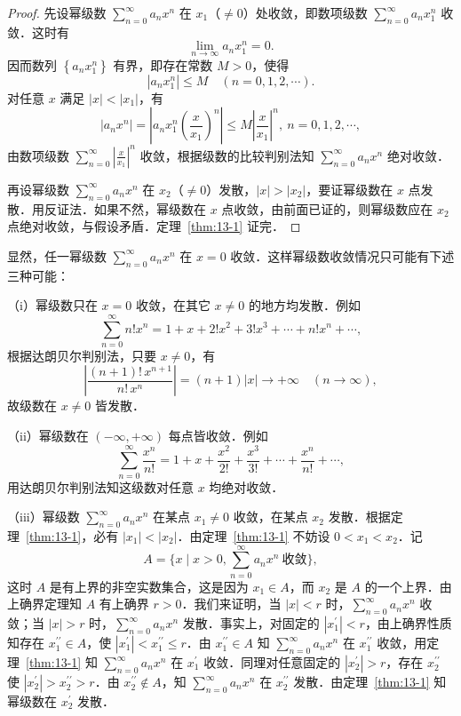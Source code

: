 \begin{proof}
先设幂级数 $\displaystyle\sum_{n=0}^{\infty}a_{n}x^{n}$ 在 $x_{1}$（$\neq 0$）处收敛，即数项级数 $\displaystyle\sum_{n=0}^{\infty}a_{n}x_{1}^{n}$ 收敛．这时有
\[
\lim_{n\to\infty}a_{n}x_{1}^{n}=0.
\]
因而数列 $\left\{a_{n}x_{1}^{n}\right\}$ 有界，即存在常数 $M>0$，使得
\[
\left|a_{n}x_{1}^{n}\right|\leqslant M\quad(n=0,1,2,\cdots).
\]
对任意 $x$ 满足 $\left|x\right|<\left|x_{1}\right|$，有
\[
\left|a_{n}x^{n}\right|=\left|a_{n}x_{1}^{n}\left(\frac{x}{x_{1}}\right)^{n}\right|\leqslant M\left|\frac{x}{x_{1}}\right|^{n},\ n=0,1,2,\cdots,
\]
由数项级数 $\displaystyle\sum_{n=0}^{\infty}\left|\frac{x}{x_{1}}\right|^{n}$ 收敛，根据级数的比较判别法知 $\displaystyle\sum_{n=0}^{\infty}a_{n}x^{n}$ 绝对收敛．

再设幂级数 $\displaystyle\sum_{n=0}^{\infty}a_{n}x^{n}$ 在 $x_{2}$（$\neq 0$）发散，$\left|x\right|>\left|x_{2}\right|$，要证幂级数在 $x$ 点发散．用反证法．如果不然，幂级数在 $x$ 点收敛，由前面已证的，则幂级数应在 $x_{2}$ 点绝对收敛，与假设矛盾．定理~\ref{thm:13-1} 证完．
\end{proof}

显然，任一幂级数 $\displaystyle\sum_{n=0}^{\infty}a_{n}x^{n}$ 在 $x=0$ 收敛．这样幂级数收敛情况只可能有下述三种可能：

（i）幂级数只在 $x=0$ 收敛，在其它 $x\neq 0$ 的地方均发散．例如
\[
\sum_{n=0}^{\infty}n!x^{n}=1+x+2!x^{2}+3!x^{3}+\cdots+n!x^{n}+\cdots,
\]
根据达朗贝尔判别法，只要 $x\neq 0$，有
\[
\left|\frac{(n+1)!\,x^{n+1}}{n!\,x^{n}}\right|=(n+1)\left|x\right|\to+\infty\quad(n\to\infty),
\]
故级数在 $x\neq 0$ 皆发散．

（ii）幂级数在 $(-\infty,+\infty)$ 每点皆收敛．例如
\[
\sum_{n=0}^{\infty}\frac{x^{n}}{n!}=1+x+\frac{x^{2}}{2!}+\frac{x^{3}}{3!}+\cdots+\frac{x^{n}}{n!}+\cdots,
\]
用达朗贝尔判别法知这级数对任意 $x$ 均绝对收敛．

（iii）幂级数 $\displaystyle\sum_{n=0}^{\infty}a_{n}x^{n}$ 在某点 $x_{1}\neq 0$ 收敛，在某点 $x_{2}$ 发散．根据定理~\ref{thm:13-1}，必有 $\left|x_{1}\right|<\left|x_{2}\right|$．由定理~\ref{thm:13-1} 不妨设 $0<x_{1}<x_{2}$．记
\[
A=\{x\mid x>0,\sum_{n=0}^{\infty}a_{n}x^{n}\ \text{收敛}\},
\]
这时 $A$ 是有上界的非空实数集合，这是因为 $x_{1}\in A$，而 $x_{2}$ 是 $A$ 的一个上界．由上确界定理知 $A$ 有上确界 $r>0$．我们来证明，当 $\left|x\right|<r$ 时，$\displaystyle\sum_{n=0}^{\infty}a_{n}x^{n}$ 收敛；当 $\left|x\right|>r$ 时，$\displaystyle\sum_{n=0}^{\infty}a_{n}x^{n}$ 发散．事实上，对固定的 $\left|x_{1}^{\prime}\right|<r$，由上确界性质知存在 $x_{1}^{\prime\prime}\in A$，使 $\left|x_{1}^{\prime}\right|<x_{1}^{\prime\prime}\leqslant r$．由 $x_{1}^{\prime\prime}\in A$ 知 $\displaystyle\sum_{n=0}^{\infty}a_{n}x^{n}$ 在 $x_{1}^{\prime\prime}$ 收敛，用定理~\ref{thm:13-1} 知 $\displaystyle\sum_{n=0}^{\infty}a_{n}x^{n}$ 在 $x_{1}^{\prime}$ 收敛．同理对任意固定的 $\left|x_{2}^{\prime}\right|>r$，存在 $x_{2}^{\prime\prime}$ 使 $\left|x_{2}^{\prime}\right|>x_{2}^{\prime\prime}>r$．由 $x_{2}^{\prime\prime}\notin A$，知 $\displaystyle\sum_{n=0}^{\infty}a_{n}x^{n}$ 在 $x_{2}^{\prime\prime}$ 发散．由定理~\ref{thm:13-1} 知幂级数在 $x_{2}^{\prime}$ 发散．

